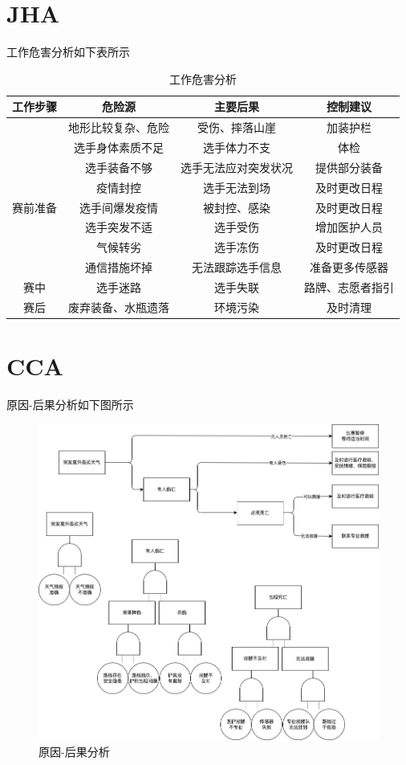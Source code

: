 \documentclass[a4paper,12pt]{ctexart}
\begin{document}
\section{JHA}
工作危害分析如下表所示
\begin{table}[H]
    \caption{工作危害分析}
    \centering
    \begin{tabular}{cccc}
        \toprule
        工作步骤                   & 危险源       & 主要后果       & 控制建议     \\
        \midrule
                               & 地形比较复杂、危险 & 受伤、摔落山崖    & 加装护栏     \\
                               & 选手身体素质不足  & 选手体力不支     & 体检       \\
                               & 选手装备不够    & 选手无法应对突发状况 & 提供部分装备   \\
                               & 疫情封控      & 选手无法到场     & 及时更改日程   \\
        \multirow{-5}{*}{赛前准备} & 选手间爆发疫情   & 被封控、感染     & 及时更改日程   \\
        \midrule
        & 选手突发不适    & 选手受伤       & 增加医护人员   \\
                               & 气候转劣      & 选手冻伤       & 及时更改日程   \\
                               & 通信措施坏掉    & 无法跟踪选手信息   & 准备更多传感器  \\
        \multirow{-4}{*}{赛中}   & 选手迷路      & 选手失联       & 路牌、志愿者指引 \\
        \midrule
        赛后                     & 废弃装备、水瓶遗落 & 环境污染       & 及时清理   \\

        \bottomrule
    \end{tabular}
\end{table}
\section{CCA}
原因-后果分析如下图所示
\begin{figure}[H]
    \caption{原因-后果分析}
    \centering
    \includegraphics[width=\linewidth]{cca.drawio.png}
\end{figure}
\end{document}
